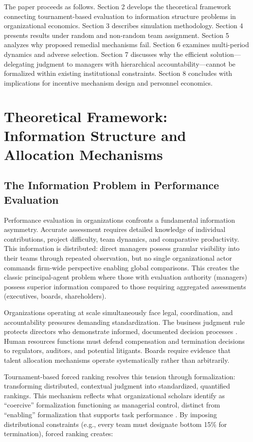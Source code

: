 \documentclass[12pt]{article}
\begin{document}
The paper proceeds as follows. Section 2 develops the theoretical framework connecting tournament-based evaluation to information structure problems in organizational economics. Section 3 describes simulation methodology. Section 4 presents results under random and non-random team assignment. Section 5 analyzes why proposed remedial mechanisms fail. Section 6 examines multi-period dynamics and adverse selection. Section 7 discusses why the efficient solution---delegating judgment to managers with hierarchical accountability---cannot be formalized within existing institutional constraints. Section 8 concludes with implications for incentive mechanism design and personnel economics.

\section{Theoretical Framework: Information Structure and Allocation Mechanisms}

\subsection{The Information Problem in Performance Evaluation}

Performance evaluation in organizations confronts a fundamental information asymmetry. Accurate assessment requires detailed knowledge of individual contributions, project difficulty, team dynamics, and comparative productivity. This information is distributed: direct managers possess granular visibility into their teams through repeated observation, but no single organizational actor commands firm-wide perspective enabling global comparisons. This creates the classic principal-agent problem where those with evaluation authority (managers) possess superior information compared to those requiring aggregated assessments (executives, boards, shareholders).

Organizations operating at scale simultaneously face legal, coordination, and accountability pressures demanding standardization. The business judgment rule protects directors who demonstrate informed, documented decision processes \citep{smith1985, badawi2023business, sharfman2017importance}. Human resources functions must defend compensation and termination decisions to regulators, auditors, and potential litigants. Boards require evidence that talent allocation mechanisms operate systematically rather than arbitrarily.

Tournament-based forced ranking resolves this tension through formalization: transforming distributed, contextual judgment into standardized, quantified rankings. This mechanism reflects what organizational scholars identify as ``coercive'' formalization functioning as managerial control, distinct from ``enabling'' formalization that supports task performance \citep{adler1996two}. By imposing distributional constraints (e.g., every team must designate bottom 15\% for termination), forced ranking creates:
\end{document}
